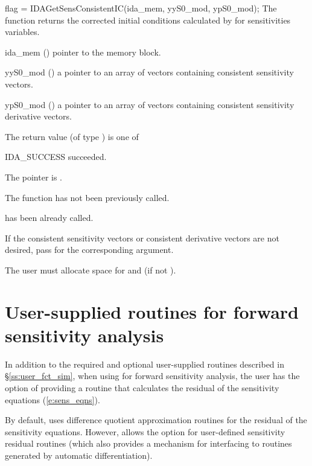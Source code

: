 {
  flag = IDAGetSensConsistentIC(ida\_mem, yyS0\_mod, ypS0\_mod);
}
{
  The function  returns the corrected initial conditions
  calculated by  for sensitivities variables.
}
{
  \begin{args}
  \item[ida\_mem] ()
    pointer to the {\idas} memory block.
  \item[yyS0\_mod] ()
    a pointer to an array of  vectors containing consistent sensitivity 
    vectors.
  \item[ypS0\_mod] ()
    a pointer to an array of  vectors containing consistent sensitivity
    derivative vectors.
  \end{args}
}
{
  The return value  (of type ) is one of
  \begin{args}
  \item[IDA\_SUCCESS] 
     succeeded.
  \item[\Id{IDA\_MEM\_NULL}]
    The  pointer is .
  \item[\Id{IDA\_NO\_SENS}]
    The function  has not been previously called.
  \item[\Id{IDA\_ILL\_INPUT}]
     has been already called.
  \end{args}
}
{
  If the consistent sensitivity vectors or consistent derivative vectors
  are not desired, pass  for the corresponding argument.

  {\warn} The user must allocate space for  and 
  (if not ).
}

\section{User-supplied routines for forward sensitivity analysis}
\label{s:user_fct_fwd}

In addition to the required and optional user-supplied routines described
in \S\ref{ss:user_fct_sim}, when using {\idas} for forward sensitivity analysis,
the user has the option of providing a routine that calculates the residual 
of the sensitivity equations (\ref{e:sens_eqns}).

By default, {\idas} uses difference quotient approximation routines for the 
residual of the sensitivity equations. However, {\idas} allows the option for 
user-defined sensitivity residual routines (which also provides a mechanism for 
interfacing {\idas} to routines generated by automatic differentiation).

